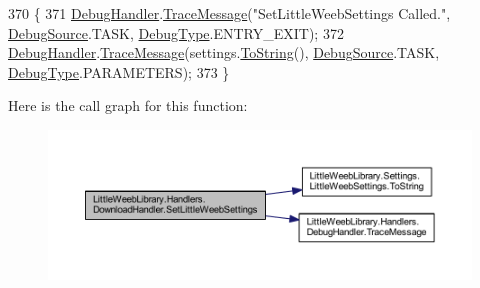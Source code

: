 \begin{DoxyCode}
370         \{
371             \mbox{\hyperlink{class_little_weeb_library_1_1_handlers_1_1_download_handler_a9f1aedadbd6f343d8de1c54724eca11e}{DebugHandler}}.\mbox{\hyperlink{interface_little_weeb_library_1_1_handlers_1_1_i_debug_handler_a2e405bc3492e683cd3702fae125221bc}{TraceMessage}}(\textcolor{stringliteral}{"SetLittleWeebSettings Called."}, 
      \mbox{\hyperlink{namespace_little_weeb_library_1_1_handlers_a2a6ca0775121c9c503d58aa254d292be}{DebugSource}}.TASK, \mbox{\hyperlink{namespace_little_weeb_library_1_1_handlers_ab66019ed40462876ec4e61bb3ccb0a62}{DebugType}}.ENTRY\_EXIT);
372             \mbox{\hyperlink{class_little_weeb_library_1_1_handlers_1_1_download_handler_a9f1aedadbd6f343d8de1c54724eca11e}{DebugHandler}}.\mbox{\hyperlink{interface_little_weeb_library_1_1_handlers_1_1_i_debug_handler_a2e405bc3492e683cd3702fae125221bc}{TraceMessage}}(settings.\mbox{\hyperlink{class_little_weeb_library_1_1_settings_1_1_little_weeb_settings_a5a5b722dd8e117be810022882795b6ae}{ToString}}(), 
      \mbox{\hyperlink{namespace_little_weeb_library_1_1_handlers_a2a6ca0775121c9c503d58aa254d292be}{DebugSource}}.TASK, \mbox{\hyperlink{namespace_little_weeb_library_1_1_handlers_ab66019ed40462876ec4e61bb3ccb0a62}{DebugType}}.PARAMETERS);
373         \}
\end{DoxyCode}
Here is the call graph for this function\+:\nopagebreak
\begin{figure}[H]
\begin{center}
\leavevmode
\includegraphics[width=350pt]{class_little_weeb_library_1_1_handlers_1_1_download_handler_a0ad546188f5b5145dd9b088852cd29f8_cgraph}
\end{center}
\end{figure}
\mbox{\label{class_little_weeb_library_1_1_handlers_1_1_download_handler_a5a28664c89bf43b921fc9d3f1845b5a1}} 
